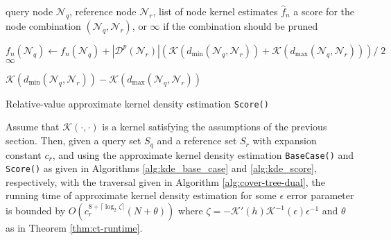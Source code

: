 \begin{algorithm}[tb]
  \begin{algorithmic}[1]
     query node $\mathscr{N}_q$, reference node
$\mathscr{N}_r$, list of node kernel estimates $\hat{f}_n$
     a score for the node combination $(\mathscr{N}_q,
\mathscr{N}_r)$, or $\infty$ if the combination should be pruned

    \medskip

      \STATE $f_n(\mathscr{N}_q) \gets f_n(\mathscr{N}_q) + |
\mathscr{D}^p(\mathscr{N}_r) | \left(\mathcal{K}(d_{\min}(\mathscr{N}_q,
\mathscr{N}_r)) + \mathcal{K}(d_{\max}(\mathscr{N}_q, \mathscr{N}_r))\right) /\;2$
      \RETURN $\infty$
    \ENDIF

    \RETURN $\mathcal{K}(d_{\min}(\mathscr{N}_q, \mathscr{N}_r)) -
\mathcal{K}(d_{\max}(\mathscr{N}_q, \mathscr{N}_r))$
  \end{algorithmic}

  \caption{Relative-value approximate kernel density estimation
\texttt{Score()}}
  \label{alg:kde_rva_score}
\end{algorithm}

\begin{thm}
Assume that $\mathcal{K}(\cdot, \cdot)$ is a kernel satisfying the assumptions
of the previous section.  Then, given a query set $S_q$ and a reference set
$S_r$ with expansion constant $c_r$, and using the approximate kernel density
estimation \texttt{BaseCase()} and \texttt{Score()} as given in Algorithms
\ref{alg:kde_base_case} and \ref{alg:kde_score}, respectively, with the
traversal given in Algorithm \ref{alg:cover-tree-dual}, the running time of
approximate kernel density estimation for some $\epsilon$ error parameter is
bounded by
$O(c_r^{8 + \lceil \log_2 \zeta \rceil} (N + \theta))$
where $\zeta = -\mathcal{K}'(h) \mathcal{K}^{-1}(\epsilon) \epsilon^{-1}$ and
$\theta$ as in Theorem \ref{thm:ct-runtime}.

\label{thm:kde-bound}
\end{thm}

